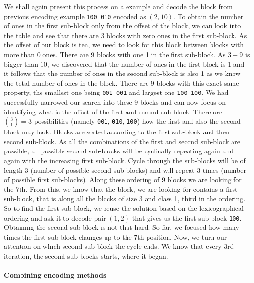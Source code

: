 
We shall again present this process on a example and decode the block from previous
encoding example {\tt 100 010} encoded as $(2, 10)$. To obtain the number of ones in
the first sub-block only from the offset of the block, we can look into the table and
see that there are 3 blocks with zero ones in the first sub-block. As the offset of our
block is ten, we need to look for this block between blocks with more than 0 ones. There
are 9 blocks with one 1 in the first sub-block. As $3+9$ is bigger than 10, we discovered
that the number of ones in the
first block is 1 and it follows that the number of ones in the second sub-block is
also 1 as we know the total number of ones in the block. There are 9 blocks with
this exact same property, the smallest one being {\tt 001 001} and largest one
{\tt 100 100}. We had successfully narrowed our search into these 9 blocks and can now
focus on identifying what is the offset of the first and second sub-block. There are
${3 \choose 1} = 3$ possibilities (namely {\tt 001}, {\tt 010}, {\tt 100}) how the first
and also the second block may look. Blocks are sorted according
to the first sub-block and then second sub-block. As all the combinations of the first
and second sub-block are possible, all possible second sub-blocks will be cyclically
repeating again and again with the increasing first sub-block. Cycle through
the sub-blocks will be of length 3 (number of possible second sub-blocks) and will repeat
3 times (number of possible first sub-blocks). Along these ordering of 9 blocks we are
looking for the 7th. From this, we know that the block, we are looking for contains a
first sub-block, that is along all the blocks of size 3 and class 1, third in the ordering.
So to find the first sub-block, we reuse the solution based on the lexicographical ordering
and ask it to decode pair $(1, 2)$ that gives us the first sub-block {\tt 100}. Obtaining
the second sub-block is not that hard. So far, we focused how many times the first sub-block
changes up to the 7th position. Now, we turn our attention on which second sub-block the cycle
ends. We know that every 3rd iteration, the second sub-blocks starts, where it began.

\paragraph{Combining encoding methods}

